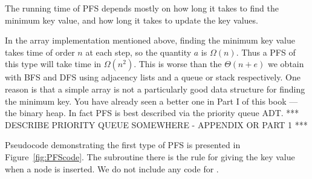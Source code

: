 The running time of PFS depends mostly on how long it takes to find the
minimum key value, and how long it takes to update the key values.

In the array implementation mentioned above, finding the minimum key
value takes time of order $n$ at each step, so the quantity $a$ is
$\Omega(n)$. Thus a PFS of this type will take time in $\Omega(n^2)$.
This is worse than the $\Theta(n + e)$ we obtain with BFS and DFS using
adjacency lists and a queue or stack respectively. One reason is that a
simple array is not a particularly good data structure for finding the
minimum key. You have already seen a better one in Part I of this book
--- the binary heap. In fact PFS is best described via the priority
queue ADT. *** DESCRIBE PRIORITY QUEUE SOMEWHERE - APPENDIX OR PART 1 *** 

Pseudocode demonstrating the first type of PFS is presented in
Figure~\ref{fig:PFScode}. The subroutine  there is the rule for giving the key value when a node is inserted. We do not include any code for .

